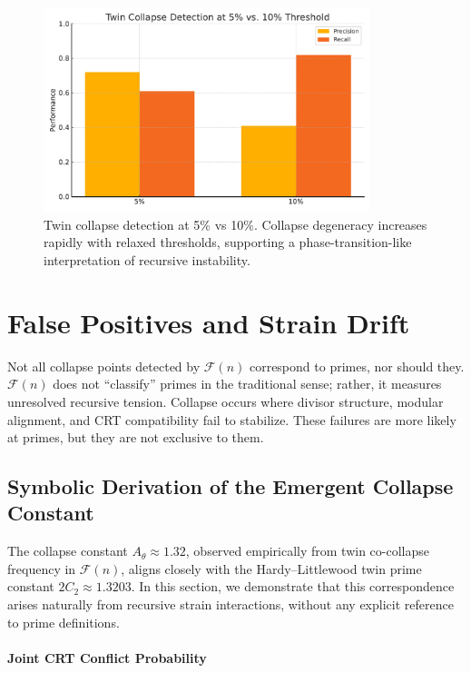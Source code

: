 \documentclass[11pt]{article}
\begin{document}
\begin{figure}[H]
\centering
\includegraphics[width=0.85\textwidth]{twin_collapse_detection.pdf}
\caption{Twin collapse detection at 5\% vs 10\%. Collapse degeneracy increases rapidly with relaxed thresholds, supporting a phase-transition-like interpretation of recursive instability.}
\label{fig:twin}
\end{figure}



\section{False Positives and Strain Drift}

Not all collapse points detected by \(\mathcal{F}(n)\) correspond to primes, nor should they. \(\mathcal{F}(n)\) does not “classify” primes in the traditional sense; rather, it measures unresolved recursive tension. Collapse occurs where divisor structure, modular alignment, and CRT compatibility fail to stabilize. These failures are more likely at primes, but they are not exclusive to them.


\subsection{Symbolic Derivation of the Emergent Collapse Constant}

The collapse constant \( A_\theta \approx 1.32 \), observed empirically from twin co-collapse frequency in \(\mathcal{F}(n)\), aligns closely with the Hardy–Littlewood twin prime constant \( 2C_2 \approx 1.3203 \). In this section, we demonstrate that this correspondence arises naturally from recursive strain interactions, without any explicit reference to prime definitions.


\paragraph{Joint CRT Conflict Probability}
\end{document}
